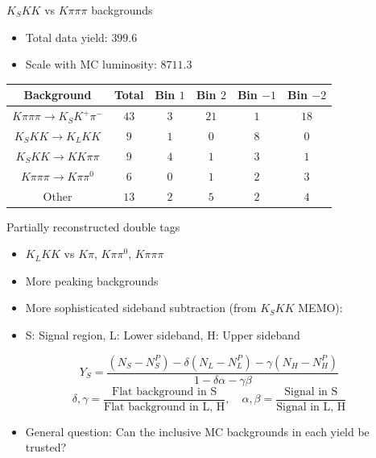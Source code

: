 \documentclass{beamer}
\begin{document}
\begin{frame}{$K_SKK$ vs $K\pi\pi\pi$ backgrounds}
  \begin{itemize}
    \item{Total data yield: $399.6$}
    \item{Scale with MC luminosity: $8711.3$}
  \end{itemize}
  \vspace{0.5cm}
  \centering
  \def\arraystretch{1.2}%
  \begin{tabular}{c|ccccc}
    Background                    & Total  & Bin $1$ & Bin $2$ & Bin $-1$ & Bin $-2$ \\
    \hline
    $K\pi\pi\pi\to K_SK^+\pi^-$   & $43$   & $3$     & $21$    & $1$      & $18$ \\
    $K_SKK\to K_LKK$              & $9$    & $1$     & $0$     & $8$      & $0$ \\
    $K_SKK\to KK\pi\pi$           & $9$    & $4$     & $1$     & $3$      & $1$ \\
    $K\pi\pi\pi\to K\pi\pi^0$     & $6$    & $0$     & $1$     & $2$      & $3$ \\
    Other                         & $13$   & $2$     & $5$     & $2$      & $4$ \\
    \hline
  \end{tabular}
  \vspace{0.5cm}
\end{frame}

\begin{frame}{Partially reconstructed double tags}
  \begin{itemize}
    \setlength\itemsep{1em}
    \item{$K_LKK$ vs $K\pi$, $K\pi\pi^0$, $K\pi\pi\pi$}
    \item{More peaking backgrounds}
    \item{More sophisticated sideband subtraction (from $K_SKK$ MEMO):}
    \item{S: Signal region, L: Lower sideband, H: Upper sideband}
  \end{itemize}
  \begin{equation*}
    Y_S = \frac{(N_S - N_S^P) - \delta(N_L - N_L^P) - \gamma(N_H - N_H^P)}{1 - \delta\alpha - \gamma\beta}
  \end{equation*}
  \begin{equation*}
    \delta, \gamma = \frac{\text{Flat background in S}}{\text{Flat background in L, H}}, \quad \alpha, \beta = \frac{\text{Signal in S}}{\text{Signal in L, H}}
  \end{equation*}
  \begin{itemize}
    \item{General question: Can the inclusive MC backgrounds in each yield be trusted?}
  \end{itemize}
\end{frame}
\end{document}
